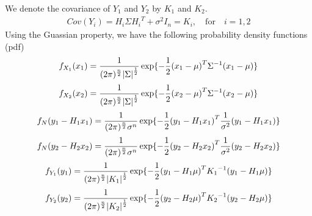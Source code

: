 \documentclass{article}
\begin{document}
We denote the covariance of $Y_1$ and $Y_2$ by $K_1$ and $K_2$.
\begin{eqnarray}
Cov(Y_i) = H_i \Sigma {H_i}^T + {\sigma}^2 I_n = K_i , \quad \text{for} \quad i=1,2 
\end{eqnarray}
Using the Guassian property, we have the following probability density functions (pdf)
\begin{equation}
\small{
f_{X_1}(x_1) = \frac{1}{({2\pi})^{\frac{n}{2}} {|\Sigma|}^{\frac{1}{2}}} \exp\{-\frac{1}{2}{(x_1-\mu)}^T {\Sigma}^{-1}(x_1-\mu)\} }
\end{equation}
\begin{equation}
\small{f_{X_2}(x_2) = \frac{1}{({2\pi})^{\frac{n}{2}} {|\Sigma|}^{\frac{1}{2}}} \exp\{-\frac{1}{2}{(x_2-\mu)}^T {\Sigma}^{-1}(x_2-\mu)\} }
\end{equation}
\begin{equation}
\small{f_N(y_1-H_1 x_1) = \frac{1}{({2\pi})^{\frac{n}{2}}\sigma^n} \exp\{-\frac{1}{2}{(y_1-H_1 x_1)}^T \frac{1}{\sigma^2}(y_1-H_1 x_1)\}}
\end{equation}
\begin{equation}
\small{f_N(y_2-H_2 x_2) = \frac{1}{({2\pi})^{\frac{n}{2}}\sigma^n} \exp\{-\frac{1}{2}{(y_2-H_2 x_2)}^T \frac{1}{\sigma^2} (y_2-H_2 x_2)\}}
\end{equation}
\begin{equation}
\small{f_{Y_1}(y_1) = \frac{1}{({2\pi})^{\frac{n}{2}} {|K_1|}^{\frac{1}{2}}} \exp\{-\frac{1}{2}{(y_1-H_1\mu)}^T {K_1}^{-1}(y_1-H_1\mu)\}}
\end{equation}
\begin{equation}
\small{f_{Y_2}(y_2) = \frac{1}{({2\pi})^{\frac{n}{2}} {|K_2|}^{\frac{1}{2}}} \exp\{-\frac{1}{2}{(y_2-H_2\mu)}^T {K_2}^{-1}(y_2-H_2\mu)\}}
\end{equation}
\end{document}
